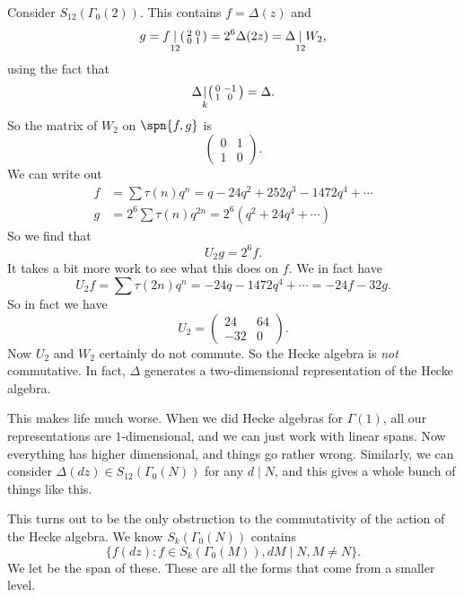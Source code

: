 \documentclass[a4paper]{article}
\begin{document}
\begin{eg}
  Consider $S_{12} (\Gamma_0(2))$. This contains $f = \Delta (z)$ and
  \[
    g = f \underset{12}{|}
    \begin{psmallmatrix}
      2 & 0\\
      0 & 1
    \end{psmallmatrix} = 2^6 \Delta(2z) = \Delta \underset{12}{|} W_2,
  \]
  using the fact that
  \[
    \Delta\underset{k}{|}
    \begin{psmallmatrix}
      0 & -1\\
      1 & 0
    \end{psmallmatrix} = \Delta.
  \]
  So the matrix of $W_2$ on $\spn\{f, g\}$ is
  \[
    \begin{pmatrix}
      0 & 1\\
      1 & 0
    \end{pmatrix}.
  \]
  We can write out
  \begin{align*}
    f &= \sum \tau(n) q^n = q - 24 q^2 + 252q^3 - 1472 q^4 + \cdots\\
    g &= 2^6 \sum \tau(n) q^{2n} = 2^6(q^2 + 24 q^4 + \cdots)
  \end{align*}
  So we find that
  \[
    U_2 g = 2^6 f.
  \]
  It takes a bit more work to see what this does on $f$. We in fact have
  \[
    U_2 f = \sum \tau(2n) q^n = -24 q - 1472 q^4 + \cdots = -24 f - 32 g.
  \]
  So in fact we have
  \[
    U_2 =
    \begin{pmatrix}
      24 & 64\\
      -32 & 0
    \end{pmatrix}.
  \]
  Now $U_2$ and $W_2$ certainly do not commute. So the Hecke algebra is \emph{not} commutative. In fact, $\Delta$ generates a two-dimensional representation of the Hecke algebra.
\end{eg}

This makes life much worse. When we did Hecke algebras for $\Gamma(1)$, all our representations are $1$-dimensional, and we can just work with linear spans. Now everything has higher dimensional, and things go rather wrong. Similarly, we can consider $\Delta(dz) \in S_{12}(\Gamma_0(N))$ for any $d \mid N$, and this gives a whole bunch of things like this.

This turns out to be the only obstruction to the commutativity of the action of the Hecke algebra. We know $S_k(\Gamma_0(N))$ contains
\[
  \{f(dz): f \in S_k(\Gamma_0(M)), dM \mid N, M \not= N\}.
\]
We let  be the span of these. These are all the forms that come from a smaller level.
\end{document}
